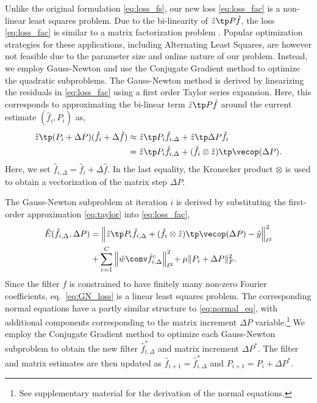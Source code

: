\documentclass[10pt,twocolumn,letterpaper]{article}
\begin{document}
Unlike the original formulation \eqref{eq:loss_fs}, our new loss \eqref{eq:loss_fac} is a non-linear least squares problem. Due to the bi-linearity of $\hat{z}\tp P \hat{f}$, the loss \eqref{eq:loss_fac} is similar to a matrix factorization problem \cite{Hong_2015_ICCV}. Popular optimization strategies for these applications, including Alternating Least Squares, are however not feasible due to the parameter size and online nature of our problem. Instead, we employ Gauss-Newton \cite{NumericalOptimization} and use the Conjugate Gradient method to optimize the quadratic subproblems. The Gauss-Newton method is derived by linearizing the residuals in \eqref{eq:loss_fac} using a first order Taylor series expansion. Here, this corresponds to approximating the bi-linear term $\hat{z}\tp P \hat{f}$ around the current estimate $(\hat{f}_i, P_i)$ as,
\begin{align}
\label{eq:taylor}
\hat{z}\tp (P_i + \Delta P) (\hat{f}_i + \Delta {\hat{f}}) & \approx \hat{z}\tp P_i \hat{f}_{i,\Delta} + \hat{z}\tp \Delta P \hat{f}_i \\
&= \hat{z}\tp P_i \hat{f}_{i,\Delta} + (\hat{f}_i \otimes \hat{z})\tp \vecop(\Delta P) . \nonumber
\end{align}
Here, we set $\hat{f}_{i,\Delta} = \hat{f}_i + \Delta {\hat{f}}$. In the last equality, the Kronecker product $\otimes$ is used to obtain a vectorization of the matrix step $\Delta P$.

The Gauss-Newton subproblem at iteration $i$ is derived by substituting the first-order approximation \eqref{eq:taylor} into \eqref{eq:loss_fac},
\begin{align}
	\label{eq:GN_loss}
	\tilde{E}(\hat{f}_{i,\Delta}, \Delta P) &= \left\|\hat{z}\tp P_i \hat{f}_{i,\Delta} + (\hat{f}_i \otimes \hat{z})\tp \vecop(\Delta P) - \hat{y}\right\|^2_{\ell^2} \nonumber \\ &+ \sum_{c=1}^{C} \left\|\hat{w} \conv \hat{f}_{i,\Delta}^c \right\|^2_{\ell^2} \! + \mu \|P_i + \Delta P\|_F^2 .
\end{align}
Since the filter $f$ is constrained to have finitely many non-zero Fourier coefficients, eq.\ \eqref{eq:GN_loss} is a linear least squares problem. The corresponding normal equations have a partly similar structure to \eqref{eq:normal_eq}, with additional components corresponding to the matrix increment $\Delta P$ variable.\footnote{See supplementary material for the derivation of the normal equations.} We employ the Conjugate Gradient method to optimize each Gauss-Newton subproblem to obtain the new filter $\hat{f}_{i,\Delta}^*$ and matrix increment $\Delta P^*$. The filter and matrix estimates are then updated as $\hat{f}_{i+1} = \hat{f}_{i,\Delta}^*$ and $P_{i+1} = P_i + \Delta P^*$.
\end{document}
